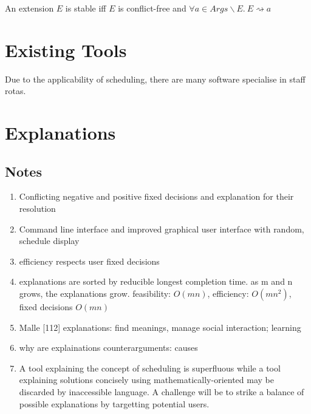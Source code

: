 \begin{definition}
	An extension $E$ is stable iff $E$ is conflict-free and $\forall a\in Args\backslash E.\ E\rightsquigarrow a$
\end{definition}

\section{Existing Tools}

Due to the applicability of scheduling, there are many software specialise in staff rotas.

\section{Explanations}

\subsection{Notes}
\begin{enumerate}
	\item Conflicting negative and positive fixed decisions and explanation for their resolution
	\item Command line interface and improved graphical user interface with random, schedule display
	\item efficiency respects user fixed decisions
	\item explanations are sorted by reducible longest completion time. as m and n grows, the explanations grow. feasibility: $O(mn)$, efficiency: $O(mn^2)$, fixed decisions $O(mn)$
	\item Malle [112] explanations: find meanings, manage social interaction; learning
	\item why are explainations counterarguments: causes
	\item A tool explaining the concept of scheduling is superfluous while a tool explaining solutions concisely using mathematically-oriented may be discarded by inaccessible language. A challenge will be to strike a balance of possible explanations by targetting potential users.
\end{enumerate}

